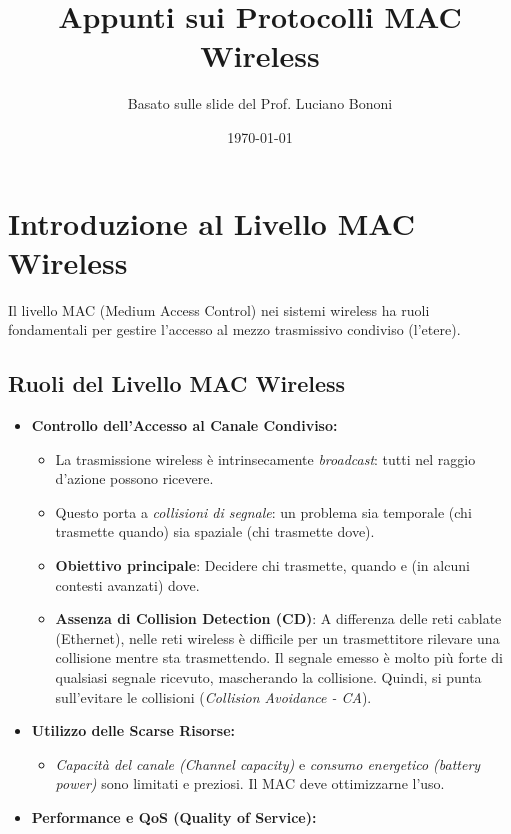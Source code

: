 \documentclass{article}
\title{Appunti sui Protocolli MAC Wireless}
\author{Basato sulle slide del Prof. Luciano Bononi}
\date{\today}
\begin{document}
\maketitle
\tableofcontents
\newpage

\section{Introduzione al Livello MAC Wireless}
Il livello MAC (Medium Access Control) nei sistemi wireless ha ruoli fondamentali per gestire l'accesso al mezzo trasmissivo condiviso (l'etere).

\subsection{Ruoli del Livello MAC Wireless}
\begin{itemize}
    \item \textbf{Controllo dell'Accesso al Canale Condiviso:}
    \begin{itemize}
        \item La trasmissione wireless è intrinsecamente \textit{broadcast}: tutti nel raggio d'azione possono ricevere.
        \item Questo porta a \textit{collisioni di segnale}: un problema sia temporale (chi trasmette quando) sia spaziale (chi trasmette dove).
        \item \textbf{Obiettivo principale}: Decidere chi trasmette, quando e (in alcuni contesti avanzati) dove.
        \item \textbf{Assenza di Collision Detection (CD)}: A differenza delle reti cablate (Ethernet), nelle reti wireless è difficile per un trasmettitore rilevare una collisione mentre sta trasmettendo. Il segnale emesso è molto più forte di qualsiasi segnale ricevuto, mascherando la collisione. Quindi, si punta sull'evitare le collisioni (\textit{Collision Avoidance - CA}).
    \end{itemize}
    \item \textbf{Utilizzo delle Scarse Risorse:}
    \begin{itemize}
        \item \textit{Capacità del canale (Channel capacity)} e \textit{consumo energetico (battery power)} sono limitati e preziosi. Il MAC deve ottimizzarne l'uso.
    \end{itemize}
    \item \textbf{Performance e QoS (Quality of Service):}
    \begin{itemize}

\end{itemize}
\end{itemize}
\end{document}
